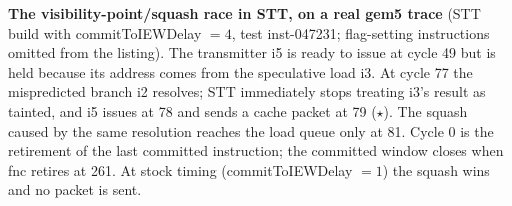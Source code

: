 \textbf{The visibility-point/squash race in STT, on a real gem5 trace} (STT build with commitToIEWDelay $=4$, test inst-047231; flag-setting instructions omitted from the listing). The transmitter i5 is ready to issue at cycle 49 but is held because its address comes from the speculative load i3. At cycle 77 the mispredicted branch i2 resolves; STT immediately stops treating i3's result as tainted, and i5 issues at 78 and sends a cache packet at 79 ($\star$). The squash caused by the same resolution reaches the load queue only at 81. Cycle 0 is the retirement of the last committed instruction; the committed window closes when fnc retires at 261. At stock timing (commitToIEWDelay $=1$) the squash wins and no packet is sent.
